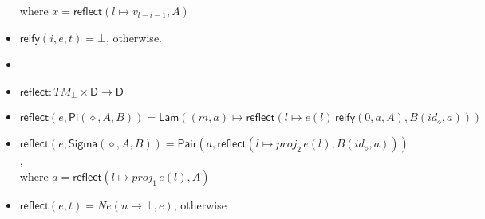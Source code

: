 \documentclass{amsart}
\theoremstyle{definition}
\theoremstyle{remark}
\newcommand{\D}{\mathsf{D}}
\numberwithin{table}{section}
\begin{document}
\begin{itemize}
        \indent where $x = \mathsf{reflect}(l \mapsto v_{l - i - 1}, A)$
\item[] $\mathsf{reify}(i, e, t) = \bot$, otherwise.
\item[]
\item[] $\mathsf{reflect} : TM_\bot \times \D \to \D$
\item[] $\mathsf{reflect}(e,\mathsf{Pi}(\diamond, A, B)) = \mathsf{Lam}((m, a) \mapsto \mathsf{reflect}(l \mapsto e(l)\,\mathsf{reify}(0, a, A), B(id_\diamond, a)))$
\item[] $\mathsf{reflect}(e,\mathsf{Sigma}(\diamond, A, B)) = \mathsf{Pair}(a, \mathsf{reflect}(l \mapsto proj_2\,e(l), B(id_\diamond, a)))$, \\
        \indent where $a = \mathsf{reflect}(l \mapsto proj_1\,e(l), A)$
\item[] $\mathsf{reflect}(e,t) = Ne(n \mapsto \bot, e)$, otherwise
\end{itemize}



\end{document}

